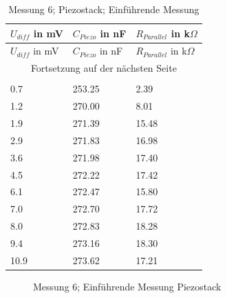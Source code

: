 \documentclass[12pt]{scrreprt} %
\begin{document}
\setlongtables
\begin{longtable}{| l |l| l |}
\hline
$U_{diff}$ in mV&$C_{Piezo}$ in nF&$R_{Parallel}$ in k$\Omega$\\
\hline
\endfirsthead
\hline
$U_{diff}$ in mV&$C_{Piezo}$ in nF&$R_{Parallel}$ in k$\Omega$\\
\hline
\endhead
\hline
\multicolumn{3}{|c|}{Fortsetzung auf der nächsten Seite}\\
\hline
\endfoot
\hline \hline
\caption{Messung 6; Piezostack; Einführende Messung}\\
\endlastfoot
\hline
\label{tab:2.6}%
0.7&253.25&2.39\\
1.2&270.00&8.01\\
1.9&271.39&15.48\\
2.9&271.83&16.98\\
3.6&271.98&17.40\\
4.5&272.22&17.42\\
6.1&272.47&15.80\\
7.0&272.70&17.72\\
8.0&272.83&18.28\\
9.4&273.16&18.30\\
10.9&273.62&17.21\\
\end{longtable}

\begin {figure}[htbp]
      \begin{center}
      \end{center}
\caption{Messung 6; Einführende Messung Piezostack}
\label{fig:2.6}
\end{figure}
\end{document}
